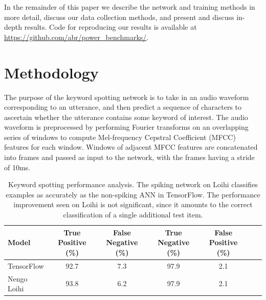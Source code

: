 \documentclass{article}
\begin{document}
In the remainder of this paper we describe the network and training methods in more detail, discuss our data collection methods, and present and discuss in-depth results. Code for reproducing our results is available at \url{https://github.com/abr/power\_benchmarks/}.

\section{Methodology}


The purpose of the keyword spotting network is to take in an audio waveform corresponding to an utterance, and then predict a sequence of characters to ascertain whether the utterance contains some keyword of interest. The audio waveform is preprocessed by performing Fourier transforms on an overlapping series of windows to compute Mel-frequency Cepstral Coefficient (MFCC) features for each window. Windows of adjacent MFCC features are concatenated into frames and passed as input to the network, with the frames having a stride of 10ms.  

\begin{table}[t!]
\vskip 0.15in
\begin{center}
\begin{small}
\begin{sc}
\begin{tabular}{lcccccc}
\hline
\abovespace\belowspace
Model & True Positive (\%) & False Negative (\%) & True Negative (\%) & False Positive (\%) \\
\hline
\abovespace
TensorFlow & 92.7 & 7.3 & 97.9 & 2.1 \\   
\belowspace
Nengo Loihi & 93.8 & 6.2 & 97.9 & 2.1 \\

\hline
\end{tabular}
\end{sc}
\end{small}
\end{center}
\vskip -0.1in
\caption{Keyword spotting performance analysis. The spiking network on Loihi classifies examples as accurately as the non-spiking ANN in TensorFlow. The performance improvement seen on Loihi is not significant, since it amounts to the correct classification of a single additional test item.}
\label{acc-table}
\end{table}
\end{document}
